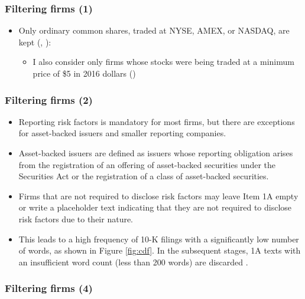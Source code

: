 \documentclass{beamer}
\newcommand{\ffo}{dicfullmc10thr10defnob40noa0_8_4t}
\begin{document}
\begin{frame}
\frametitle{Filtering firms (1)}
\begin{itemize}
\item Only ordinary common shares, traded at NYSE, AMEX, or NASDAQ, are kept (\cite{Stambaugh2016-eb}, \cite{Golubov2019-ku}):
\begin{itemize}
  \item I also consider only firms whose stocks were being traded at a minimum price of \$5 in 2016 dollars (\cite{Stambaugh2016-eb})
\end{itemize}
\end{itemize}
\end{frame}



\begin{frame}
\frametitle{Filtering firms (2)}
\begin{itemize}
\item Reporting risk factors is mandatory for most firms, but there are exceptions for asset-backed issuers and smaller reporting companies.
\item Asset-backed issuers are defined as issuers whose reporting obligation arises from the registration of an offering of asset-backed securities under the Securities Act or the registration of a class of asset-backed securities.
\item Firms that are not required to disclose risk factors may leave Item 1A empty or write a placeholder text indicating that they are not required to disclose risk factors due to their nature.
\item This leads to a high frequency of 10-K filings with a significantly low number of words, as shown in Figure \ref{fig:cdf}. In the subsequent stages, 1A texts with an insufficient word count (less than 200 words) are discarded \hyperlink{min_words}{}.

\end{itemize}
\end{frame}


\begin{frame}
\frametitle{Filtering firms (4)}
\scriptsize

\end{frame}
\end{document}
